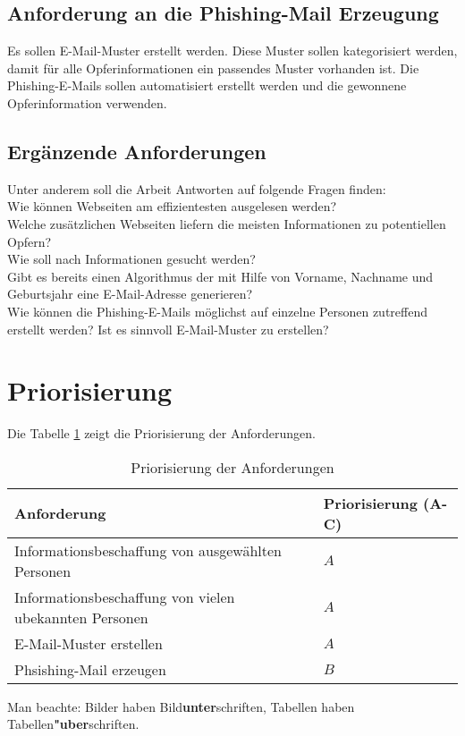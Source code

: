	\subsection{Anforderung an die Phishing-Mail Erzeugung}
	Es sollen E-Mail-Muster erstellt werden. Diese Muster sollen kategorisiert werden, damit für alle Opferinformationen ein passendes Muster vorhanden ist.
	Die Phishing-E-Mails sollen automatisiert erstellt werden und die gewonnene Opferinformation verwenden.
	
	\subsection{Ergänzende Anforderungen}
	Unter anderem soll die Arbeit Antworten auf folgende Fragen finden:\\
	Wie können Webseiten am effizientesten ausgelesen werden?\\
	Welche zusätzlichen Webseiten liefern die meisten Informationen zu potentiellen Opfern?\\
	Wie soll nach Informationen gesucht werden?\\
	Gibt es bereits einen Algorithmus der mit Hilfe von Vorname, Nachname und Geburtsjahr eine E-Mail-Adresse generieren?\\
	Wie können die Phishing-E-Mails möglichst auf einzelne Personen zutreffend erstellt werden? Ist es sinnvoll E-Mail-Muster zu erstellen?\\

\FloatBarrier
\section{Priorisierung} %
\label{sec:} %
Die Tabelle \ref{tab:prio} zeigt die Priorisierung der Anforderungen.

\begin{table}
	
	\caption{Priorisierung der Anforderungen}
	\label{tab:prio}
	\begin{center} 
		\begin{tabular}{|l|l|}
			\hline
			Anforderung & Priorisierung (A-C) \\
			\hline
			Informationsbeschaffung von ausgewählten Personen & $ A $ \\
			\hline
			Informationsbeschaffung von vielen ubekannten Personen & $ A $ \\
			\hline
			E-Mail-Muster erstellen & $ A $    \\
			\hline
			Phsishing-Mail erzeugen & $ B $   \\
			\hline
		\end{tabular}
	\end{center}
\end{table}
\FloatBarrier
Man beachte: Bilder haben Bild{\bf unter}schriften, 
Tabellen haben Tabellen{\bf "uber}schriften.